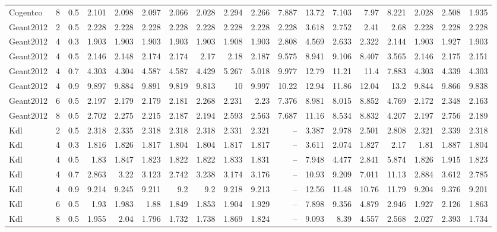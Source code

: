 \begin{table}
\begin{tabular}{lrrrrrrrrrrrrrrrrr}
Cogentco & 8 & 0.5 & 2.101 & 2.098 & 2.097 & 2.066 & 2.028 & 2.294 & 2.266 & 7.887 & 13.72 & 7.103 & 7.97 & 8.221 & 2.028 & 2.508 & 1.935 \\
Geant2012 & 2 & 0.5 & 2.228 & 2.228 & 2.228 & 2.228 & 2.228 & 2.228 & 2.228 & 2.228 & 3.618 & 2.752 & 2.41 & 2.68 & 2.228 & 2.228 & 2.228 \\
Geant2012 & 4 & 0.3 & 1.903 & 1.903 & 1.903 & 1.903 & 1.903 & 1.908 & 1.903 & 2.808 & 4.569 & 2.633 & 2.322 & 2.144 & 1.903 & 1.927 & 1.903 \\
Geant2012 & 4 & 0.5 & 2.146 & 2.148 & 2.174 & 2.174 & 2.17 & 2.18 & 2.187 & 9.575 & 8.941 & 9.106 & 8.407 & 3.565 & 2.146 & 2.175 & 2.151 \\
Geant2012 & 4 & 0.7 & 4.303 & 4.304 & 4.587 & 4.587 & 4.429 & 5.267 & 5.018 & 9.977 & 12.79 & 11.21 & 11.4 & 7.883 & 4.303 & 4.339 & 4.303 \\
Geant2012 & 4 & 0.9 & 9.897 & 9.884 & 9.891 & 9.819 & 9.813 & 10 & 9.997 & 10.22 & 12.94 & 11.86 & 12.04 & 13.2 & 9.844 & 9.866 & 9.838 \\
Geant2012 & 6 & 0.5 & 2.197 & 2.179 & 2.179 & 2.181 & 2.268 & 2.231 & 2.23 & 7.376 & 8.981 & 8.015 & 8.852 & 4.769 & 2.172 & 2.348 & 2.163 \\
Geant2012 & 8 & 0.5 & 2.702 & 2.275 & 2.215 & 2.187 & 2.194 & 2.593 & 2.563 & 7.687 & 11.16 & 8.534 & 8.832 & 4.207 & 2.197 & 2.756 & 2.189 \\
Kdl & 2 & 0.5 & 2.318 & 2.335 & 2.318 & 2.318 & 2.318 & 2.331 & 2.321 & -- & 3.387 & 2.978 & 2.501 & 2.808 & 2.321 & 2.339 & 2.318 \\
Kdl & 4 & 0.3 & 1.816 & 1.826 & 1.817 & 1.804 & 1.804 & 1.817 & 1.817 & -- & 3.611 & 2.074 & 1.827 & 2.17 & 1.81 & 1.887 & 1.804 \\
Kdl & 4 & 0.5 & 1.83 & 1.847 & 1.823 & 1.822 & 1.822 & 1.833 & 1.831 & -- & 7.948 & 4.477 & 2.841 & 5.874 & 1.826 & 1.915 & 1.823 \\
Kdl & 4 & 0.7 & 2.863 & 3.22 & 3.123 & 2.742 & 3.238 & 3.174 & 3.176 & -- & 10.93 & 9.209 & 7.011 & 11.13 & 2.884 & 3.612 & 2.785 \\
Kdl & 4 & 0.9 & 9.214 & 9.245 & 9.211 & 9.2 & 9.2 & 9.218 & 9.213 & -- & 12.56 & 11.48 & 10.76 & 11.79 & 9.204 & 9.376 & 9.201 \\
Kdl & 6 & 0.5 & 1.93 & 1.983 & 1.88 & 1.849 & 1.853 & 1.904 & 1.929 & -- & 7.898 & 9.356 & 4.879 & 2.946 & 1.927 & 2.126 & 1.863 \\
Kdl & 8 & 0.5 & 1.955 & 2.04 & 1.796 & 1.732 & 1.738 & 1.869 & 1.824 & -- & 9.093 & 8.39 & 4.557 & 2.568 & 2.027 & 2.393 & 1.734 \\

\end{tabular}
\end{table}
